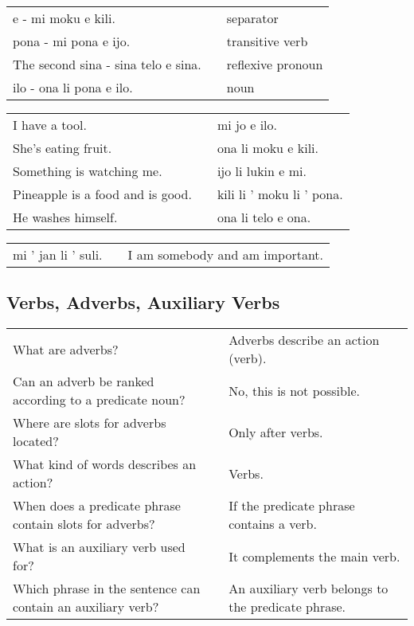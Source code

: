 \begin{supertabular}{p{5,5cm}|ll}
e - mi moku e kili. && separator \\ %
pona - mi pona e ijo. && transitive verb \\ %
The second sina - sina telo e sina. &&  reflexive pronoun \\ %
ilo - ona li pona e ilo. && noun \\ %
\end{supertabular}

\begin{supertabular}{p{5,5cm}|ll}
I have a tool. && mi jo e ilo. \\ %
She's eating fruit. && ona li moku e kili. \\ %
Something is watching me. && ijo li lukin e mi. \\ %
Pineapple is a food and is good. && kili li ' moku li ' pona. \\ %
He washes himself. && ona li telo e ona.  \\ %
\end{supertabular}  

\begin{supertabular}{p{5,5cm}|ll}
mi ' jan li ' suli. && I am somebody and am important. \\
\end{supertabular} 

\newpage
%
\subsection*{Verbs, Adverbs, Auxiliary Verbs} 
\label{'adverbs'}
%
\begin{supertabular}{p{5,5cm}|ll}
What are adverbs? && Adverbs describe an action (verb). \\ %
Can an adverb be ranked according to a predicate noun? && No, this is not possible.  \\ %
Where are slots for adverbs located? && Only after verbs. \\ %
What kind of words describes an action? && Verbs. \\ %
When does a predicate phrase contain slots for adverbs? && If the predicate phrase contains a verb. \\ %
What is an auxiliary verb used for?  && It complements the main verb.  \\ %
Which phrase in the sentence can contain an auxiliary verb? && An auxiliary verb belongs to the predicate phrase.  \\ %
\end{supertabular} 

